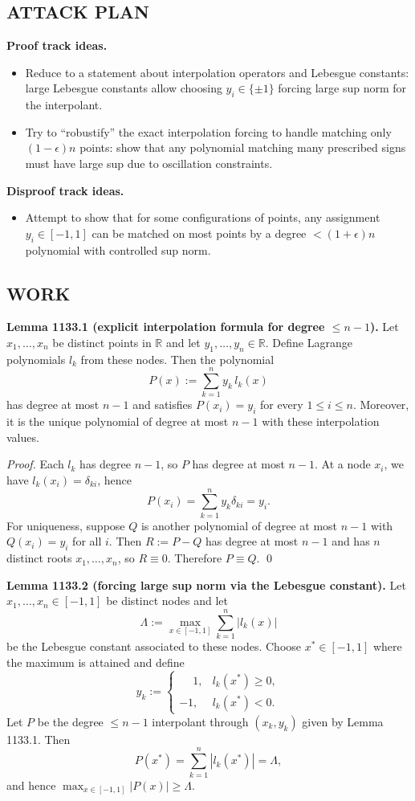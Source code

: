 \subsection*{ATTACK PLAN}
\textbf{Proof track ideas.}
\begin{itemize}
\item Reduce to a statement about interpolation operators and Lebesgue constants: large Lebesgue constants allow choosing $y_i\in\{\pm 1\}$ forcing large sup norm for the interpolant.
\item Try to ``robustify'' the exact interpolation forcing to handle matching only $(1-\epsilon)n$ points: show that any polynomial matching many prescribed signs must have large sup due to oscillation constraints.
\end{itemize}
\textbf{Disproof track ideas.}
\begin{itemize}
\item Attempt to show that for some configurations of points, any assignment $y_i\in[-1,1]$ can be matched on most points by a degree $<(1+\epsilon)n$ polynomial with controlled sup norm.
\end{itemize}

\subsection*{WORK}
\textbf{Lemma 1133.1 (explicit interpolation formula for degree $\le n-1$).}
Let $x_1,\dots,x_n$ be distinct points in $\mathbb{R}$ and let $y_1,\dots,y_n\in\mathbb{R}$.
Define Lagrange polynomials $l_k$ from these nodes.
Then the polynomial
\[
P(x):=\sum_{k=1}^n y_k\,l_k(x)
\]
has degree at most $n-1$ and satisfies $P(x_i)=y_i$ for every $1\le i\le n$.
Moreover, it is the unique polynomial of degree at most $n-1$ with these interpolation values.

\emph{Proof.}
Each $l_k$ has degree $n-1$, so $P$ has degree at most $n-1$.
At a node $x_i$, we have $l_k(x_i)=\delta_{ki}$, hence
\[
P(x_i)=\sum_{k=1}^n y_k\delta_{ki}=y_i.
\]
For uniqueness, suppose $Q$ is another polynomial of degree at most $n-1$ with $Q(x_i)=y_i$ for all $i$.
Then $R:=P-Q$ has degree at most $n-1$ and has $n$ distinct roots $x_1,\dots,x_n$, so $R\equiv 0$.
Therefore $P\equiv Q$.
\qed

\textbf{Lemma 1133.2 (forcing large sup norm via the Lebesgue constant).}
Let $x_1,\dots,x_n\in[-1,1]$ be distinct nodes and let
\[
\Lambda:=\max_{x\in[-1,1]}\sum_{k=1}^n |l_k(x)|
\]
be the Lebesgue constant associated to these nodes.
Choose $x^*\in[-1,1]$ where the maximum is attained and define
\[
 y_k:=\begin{cases}
 \phantom{-}1,& l_k(x^*)\ge 0,\\
 -1,& l_k(x^*)<0.
 \end{cases}
\]
Let $P$ be the degree $\le n-1$ interpolant through $(x_k,y_k)$ given by Lemma 1133.1.
Then
\[
P(x^*)=\sum_{k=1}^n |l_k(x^*)|=\Lambda,
\]
and hence $\max_{x\in[-1,1]}|P(x)|\ge \Lambda$.

